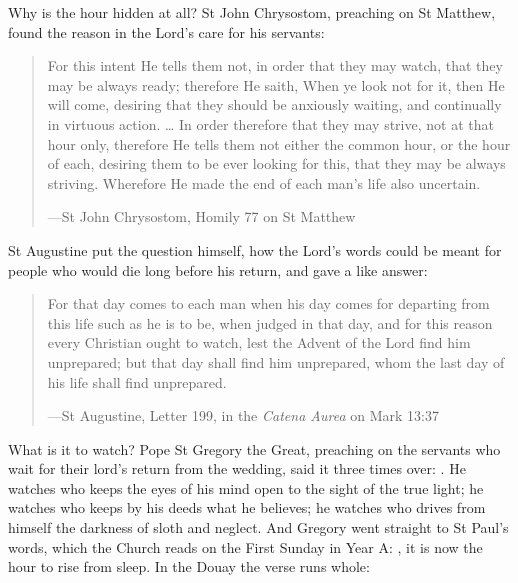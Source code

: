 Why is the hour hidden at all? St John Chrysostom, preaching on St Matthew,
found the reason in the Lord's care for his servants:

\begin{quote}
For this intent He tells them not, in order that they may watch, that they may
be always ready; therefore He saith, When ye look not for it, then He will come,
desiring that they should be anxiously waiting, and continually in virtuous
action. \ldots{} In order therefore that they may strive, not at that hour only,
therefore He tells them not either the common hour, or the hour of each,
desiring them to be ever looking for this, that they may be always striving.
Wherefore He made the end of each man's life also uncertain.\par
{\smallskip\noindent\small ---St John Chrysostom, Homily 77 on St Matthew\par}
\end{quote}

\noindent St Augustine put the question himself, how the Lord's words could be
meant for people who would die long before his return, and gave a like answer:

\begin{quote}
For that day comes to each man when his day comes for departing from this life
such as he is to be, when judged in that day, and for this reason every
Christian ought to watch, lest the Advent of the Lord find him unprepared; but
that day shall find him unprepared, whom the last day of his life shall find
unprepared.\par
{\smallskip\noindent\small ---St Augustine, Letter 199, in the \emph{Catena Aurea} on Mark 13:37\par}
\end{quote}

What is it to watch? Pope St Gregory the Great, preaching on the servants who
wait for their lord's return from the wedding, said it three times over:
. He watches who keeps the eyes of his mind open to the sight
of the true light; he watches who keeps by his deeds what he believes; he
watches who drives from himself the darkness of sloth and neglect. And Gregory
went straight to St Paul's words, which the Church reads on the First Sunday in
Year A: , it is now the hour to rise
from sleep. In the Douay the verse runs whole:

